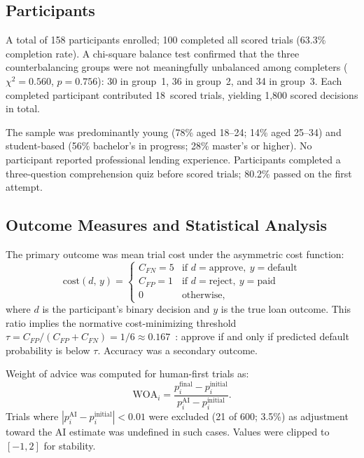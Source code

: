 \documentclass[conference]{IEEEtran}
\begin{document}
\subsection{Participants}

A total of 158 participants enrolled; 100 completed all scored trials
(63.3\% completion rate). A chi-square balance test confirmed that the
three counterbalancing groups were not meaningfully unbalanced among
completers ($\chi^2 = 0.560$, $p = 0.756$): 30 in group~1, 36 in
group~2, and 34 in group~3. Each completed participant contributed
18~scored trials, yielding 1,800 scored decisions in total.

The sample was predominantly young (78\% aged 18--24; 14\% aged 25--34)
and student-based (56\% bachelor's in progress; 28\% master's or higher).
No participant reported professional lending experience. Participants
completed a three-question comprehension quiz before scored trials;
80.2\% passed on the first attempt.

\subsection{Outcome Measures and Statistical Analysis}

The primary outcome was mean trial cost under the asymmetric cost function:
\begin{equation}
  \text{cost}(d,\,y) = \begin{cases}
    C_{FN} = 5 & \text{if } d = \text{approve},\ y = \text{default} \\
    C_{FP} = 1 & \text{if } d = \text{reject},\ y = \text{paid}     \\
    0           & \text{otherwise,}
  \end{cases}
  \label{eq:cost}
\end{equation}
where $d$ is the participant's binary decision and $y$ is the true loan
outcome. This ratio implies the normative cost-minimizing threshold
$\tau = C_{FP} / (C_{FP} + C_{FN}) = 1/6 \approx 0.167$~\cite{elkan2001foundations}:
approve if and only if predicted default probability is below $\tau$.
Accuracy was a secondary outcome.

Weight of advice was computed for human-first trials as:
\begin{equation}
  \text{WOA}_i =
    \frac{p^{\text{final}}_i - p^{\text{initial}}_i}
         {p^{\text{AI}}_i - p^{\text{initial}}_i}.
  \label{eq:woa}
\end{equation}
Trials where $|p^{\text{AI}}_i - p^{\text{initial}}_i| < 0.01$ were
excluded (21 of 600; 3.5\%) as adjustment toward the AI estimate was
undefined in such cases. Values were clipped to $[-1, 2]$ for stability.
\end{document}

